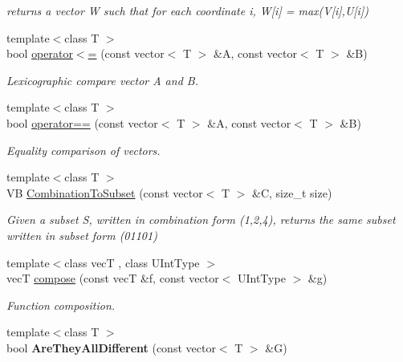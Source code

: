 \begin{DoxyCompactItemize}
\begin{DoxyCompactList}\small\item\em returns a vector W such that for each coordinate i, W\mbox{[}i\mbox{]} = max(\-V\mbox{[}i\mbox{]},\-U\mbox{[}i\mbox{]}) \end{DoxyCompactList}\item 
{\footnotesize template$<$class T $>$ }\\bool \hyperlink{namespacedscr_a603e1efc3f1121963f862d9dfba0b92b}{operator$<$=} (const vector$<$ T $>$ \&A, const vector$<$ T $>$ \&B)
\begin{DoxyCompactList}\small\item\em Lexicographic compare vector A and B. \end{DoxyCompactList}\item 
{\footnotesize template$<$class T $>$ }\\bool \hyperlink{namespacedscr_ad703d23ef086cf53f8e4892b5bc7bc57}{operator==} (const vector$<$ T $>$ \&A, const vector$<$ T $>$ \&B)
\begin{DoxyCompactList}\small\item\em Equality comparison of vectors. \end{DoxyCompactList}\item 
\hypertarget{namespacedscr_aef42c5c5c9f2905ebba5000dca764ce9}{{\footnotesize template$<$class T $>$ }\\V\-B \hyperlink{namespacedscr_aef42c5c5c9f2905ebba5000dca764ce9}{Combination\-To\-Subset} (const vector$<$ T $>$ \&C, size\-\_\-t size)}\label{namespacedscr_aef42c5c5c9f2905ebba5000dca764ce9}

\begin{DoxyCompactList}\small\item\em Given a subset S, written in combination form (1,2,4), returns the same subset written in subset form (01101) \end{DoxyCompactList}\item 
{\footnotesize template$<$class vec\-T , class U\-Int\-Type $>$ }\\vec\-T \hyperlink{namespacedscr_ac469ac556161844eb9b67aa149f7a16c}{compose} (const vec\-T \&f, const vector$<$ U\-Int\-Type $>$ \&g)
\begin{DoxyCompactList}\small\item\em Function composition. \end{DoxyCompactList}\item 
\hypertarget{namespacedscr_ac7ac0504516e0e86b70ece9e06c84b43}{{\footnotesize template$<$class T $>$ }\\bool {\bfseries Are\-They\-All\-Different} (const vector$<$ T $>$ \&G)}\label{namespacedscr_ac7ac0504516e0e86b70ece9e06c84b43}

\end{DoxyCompactItemize}
